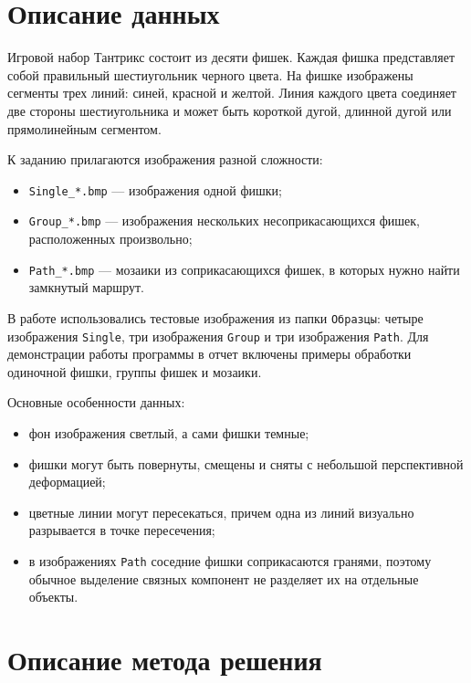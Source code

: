 \documentclass[12pt,a4paper]{article}
\begin{document}
\section{Описание данных}
Игровой набор Тантрикс состоит из десяти фишек. Каждая фишка представляет собой правильный шестиугольник черного цвета. На фишке изображены сегменты трех линий: синей, красной и желтой. Линия каждого цвета соединяет две стороны шестиугольника и может быть короткой дугой, длинной дугой или прямолинейным сегментом.

К заданию прилагаются изображения разной сложности:
\begin{itemize}[leftmargin=1.2cm]
    \item \texttt{Single\_*.bmp} --- изображения одной фишки;
    \item \texttt{Group\_*.bmp} --- изображения нескольких несоприкасающихся фишек, расположенных произвольно;
    \item \texttt{Path\_*.bmp} --- мозаики из соприкасающихся фишек, в которых нужно найти замкнутый маршрут.
\end{itemize}

В работе использовались тестовые изображения из папки \texttt{Образцы}: четыре изображения \texttt{Single}, три изображения \texttt{Group} и три изображения \texttt{Path}. Для демонстрации работы программы в отчет включены примеры обработки одиночной фишки, группы фишек и мозаики.

Основные особенности данных:
\begin{itemize}[leftmargin=1.2cm]
    \item фон изображения светлый, а сами фишки темные;
    \item фишки могут быть повернуты, смещены и сняты с небольшой перспективной деформацией;
    \item цветные линии могут пересекаться, причем одна из линий визуально разрывается в точке пересечения;
    \item в изображениях \texttt{Path} соседние фишки соприкасаются гранями, поэтому обычное выделение связных компонент не разделяет их на отдельные объекты.
\end{itemize}

\section{Описание метода решения}
\end{document}
